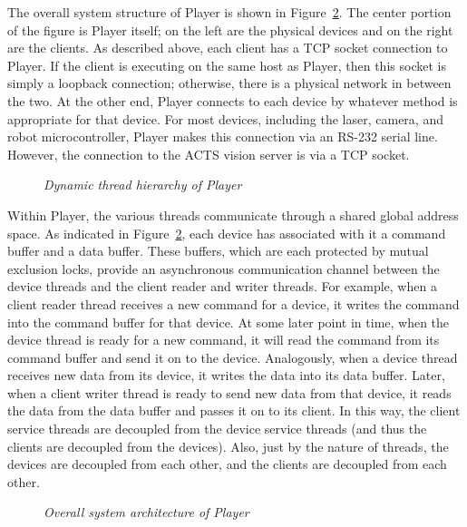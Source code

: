 \documentclass[11pt]{article}
\begin{document}
The overall system structure of Player is shown in
Figure~\ref{figure:buffers}.  The center portion of the figure
is Player itself; on the left are the physical devices and
on the right are the clients.  As described above, each client has
a TCP socket connection to Player. If the client is executing on the
same host as Player, then this socket is simply a loopback connection;
otherwise, there is a physical network in between the two.  At the other end,
Player connects to each device by whatever method is appropriate for
that device.  For most devices, including the laser, camera, and robot
microcontroller, Player makes this connection via an RS-232 serial line.
However, the connection to the ACTS vision server is via a TCP socket.

\begin{figure}[h]
 \centering
 \parbox[h]{50mm}{\textwidth {}}
  \caption{{\sl Dynamic thread hierarchy of Player}}
\label{figure:threads}
 \end{figure} 

Within Player, the various threads communicate through a shared global
address space.  As indicated in Figure~\ref{figure:buffers}, each
device has associated with it a command buffer and a data buffer.
These buffers, which are each protected by mutual exclusion locks,
provide an asynchronous communication channel between the device
threads and the client reader and writer threads.  For example, when
a client reader thread receives a new command for a device,
it writes the command into the command buffer for that device.  At
some later point in time, when the device thread is ready for a new
command, it will read the command from its command buffer and send
it on to the device.  Analogously, when a device thread receives
new data from its device, it writes the data into its data
buffer.  Later, when a client writer thread is ready to send new
data from that device, it reads the data from the data
buffer and passes it on to its client.  In this way, the client
service threads are decoupled from the device service threads (and
thus the clients are decoupled from the devices).  Also, just by the
nature of threads, the devices are decoupled from each other,
and the clients are decoupled from each other.

\begin{figure}[t]
 \centering
 \parbox[h]{50mm}{\textwidth {}}
  \caption{{\sl Overall system architecture of Player}}
  \label{figure:buffers}
\end{figure} 
\end{document}

